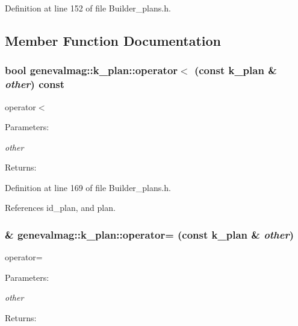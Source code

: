 Definition at line 152 of file Builder\_\-plans.h.

\subsection{Member Function Documentation}
\hypertarget{structgenevalmag_1_1k__plan_86eb6ce02cbf73824a1f34603cfc6b9f}{
\subsubsection[{operator$<$}]{\setlength{\rightskip}{0pt plus 5cm}bool genevalmag::k\_\-plan::operator$<$ (const {\bf k\_\-plan} \& {\em other}) const}}
\label{structgenevalmag_1_1k__plan_86eb6ce02cbf73824a1f34603cfc6b9f}


operator$<$ \begin{Desc}
\item[Parameters:]
\begin{description}
\item[{\em other}]\end{description}
\end{Desc}
\begin{Desc}
\item[Returns:]\end{Desc}


Definition at line 169 of file Builder\_\-plans.h.

References id\_\-plan, and plan.\hypertarget{structgenevalmag_1_1k__plan_1e209c36e06a2f83d17287e7e31f5ba8}{
\subsubsection[{operator=}]{\& genevalmag::k\_\-plan::operator= (const {\bf k\_\-plan} \& {\em other})}}
\label{structgenevalmag_1_1k__plan_1e209c36e06a2f83d17287e7e31f5ba8}


operator= \begin{Desc}
\item[Parameters:]
\begin{description}
\item[{\em other}]\end{description}
\end{Desc}
\begin{Desc}
\item[Returns:]\end{Desc}


